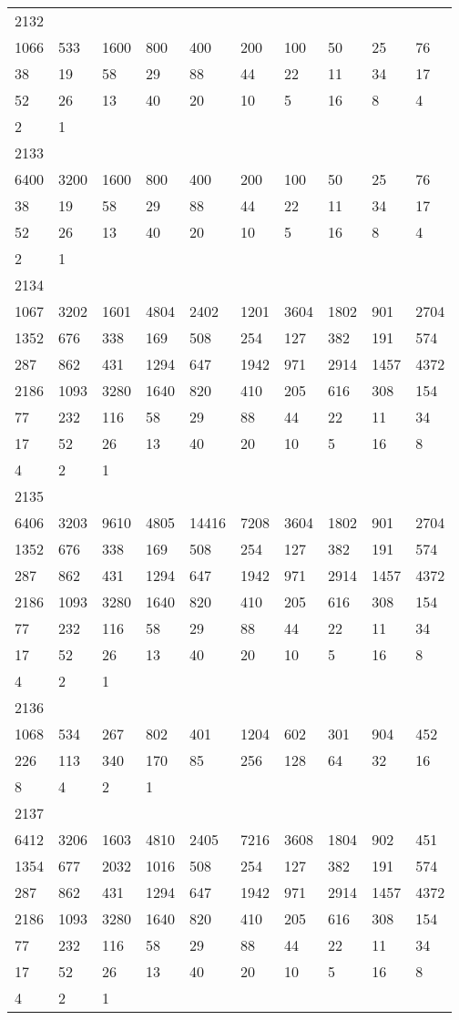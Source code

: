 \begin{longtable}{*{10}{l}}
2132&&&&&&&&&\\
1066& 533& 1600& 800& 400& 200& 100& 50& 25& 76\\
38& 19& 58& 29& 88& 44& 22& 11& 34& 17\\
52& 26& 13& 40& 20& 10& 5& 16& 8& 4\\
2& 1& \\

2133&&&&&&&&&\\
6400& 3200& 1600& 800& 400& 200& 100& 50& 25& 76\\
38& 19& 58& 29& 88& 44& 22& 11& 34& 17\\
52& 26& 13& 40& 20& 10& 5& 16& 8& 4\\
2& 1& \\

2134&&&&&&&&&\\
1067& 3202& 1601& 4804& 2402& 1201& 3604& 1802& 901& 2704\\
1352& 676& 338& 169& 508& 254& 127& 382& 191& 574\\
287& 862& 431& 1294& 647& 1942& 971& 2914& 1457& 4372\\
2186& 1093& 3280& 1640& 820& 410& 205& 616& 308& 154\\
77& 232& 116& 58& 29& 88& 44& 22& 11& 34\\
17& 52& 26& 13& 40& 20& 10& 5& 16& 8\\
4& 2& 1& \\

2135&&&&&&&&&\\
6406& 3203& 9610& 4805& 14416& 7208& 3604& 1802& 901& 2704\\
1352& 676& 338& 169& 508& 254& 127& 382& 191& 574\\
287& 862& 431& 1294& 647& 1942& 971& 2914& 1457& 4372\\
2186& 1093& 3280& 1640& 820& 410& 205& 616& 308& 154\\
77& 232& 116& 58& 29& 88& 44& 22& 11& 34\\
17& 52& 26& 13& 40& 20& 10& 5& 16& 8\\
4& 2& 1& \\

2136&&&&&&&&&\\
1068& 534& 267& 802& 401& 1204& 602& 301& 904& 452\\
226& 113& 340& 170& 85& 256& 128& 64& 32& 16\\
8& 4& 2& 1& \\

2137&&&&&&&&&\\
6412& 3206& 1603& 4810& 2405& 7216& 3608& 1804& 902& 451\\
1354& 677& 2032& 1016& 508& 254& 127& 382& 191& 574\\
287& 862& 431& 1294& 647& 1942& 971& 2914& 1457& 4372\\
2186& 1093& 3280& 1640& 820& 410& 205& 616& 308& 154\\
77& 232& 116& 58& 29& 88& 44& 22& 11& 34\\
17& 52& 26& 13& 40& 20& 10& 5& 16& 8\\
4& 2& 1& \\


\end{longtable}
